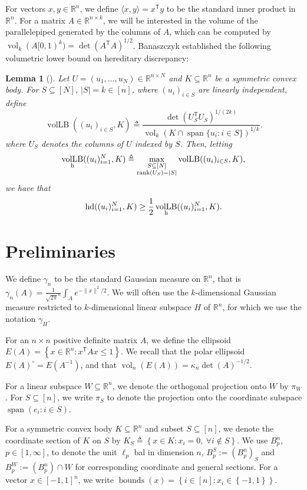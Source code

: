 \documentclass[12pt]{article}
\newtheorem{lemma}{Lemma}
\newcommand{\R}{{\mathbb{R}}}
\newcommand{\T}{\mathsf T}
\newcommand{\eqdef}{\triangleq}
\newcommand{\inner}[2]{\langle #1, #2 \rangle}
\newcommand{\set}[1]{\left\{ #1 \right\}}
\DeclareMathOperator{\vollb}{volLB}
\DeclareMathOperator{\hd}{hd}
\DeclareMathOperator{\vol}{vol}
\DeclareMathOperator{\lspan}{span}
\DeclareMathOperator{\bnds}{bounds}
\begin{document}
For vectors $x,y \in \R^n$, we define $\inner{x}{y} = x^\T y$ to be the standard
inner product in $\R^n$. For a matrix $A \in \R^{n \times k}$, we will be
interested in the volume of the parallelepiped generated by the columns of $A$,
which can be computed by $\vol_k(A[0,1)^k) = \det(A^\T A)^{1/2}$.  Banaszczyk
established the following volumetric lower bound on hereditary discrepancy:

\begin{lemma}[\cite{Bana93}]
\label{eq:vol-lb}
Let $U = (u_1,\dots,u_N) \in \R^{n \times N}$ and $K \subseteq \R^n$ be a
symmetric convex body. For $S \subseteq [N]$, $|S| = k \in [n]$, where $(u_i)_{i
\in S}$ are linearly independent, define  
\begin{equation}
\label{eq:vol-lb}
\vollb((u_i)_{i \in S}, K) 
                         \eqdef \frac{\det(U_S^\T U_S)^{1/(2k)}}{\vol_{k}(K \cap
\lspan\{u_i: i \in S\})^{1/k}}.
\end{equation}
where $U_S$ denotes the columns of $U$ indexed by $S$. Then, letting
\[
\vollb_{\rm h}((u_i)_{i=1}^N, K) \eqdef \max_{\substack{S \subseteq [N] \\ {\rm
rank}(U_S) = |S|}} \vollb((u_i)_{i \in S},K),
\]
we have that
\[
\hd((u_i)_{i=1}^N,K) \geq \frac{1}{2} \vollb_{\rm h}((u_i)_{i=1}^N,K) .
\]
\end{lemma}

\section{Preliminaries}

We define $\gamma_n$ to be the standard Gaussian measure on $\R^n$, that is
$\gamma_n(A) = \frac{1}{\sqrt{2\pi}^n} \int_A e^{-\|x\|^2/2}$. We will often use
the $k$-dimensional Gaussian measure restricted to $k$-dimensional linear
subspace $H$ of $\R^n$, for which we use the notation $\gamma_H$.

For an $n \times n$ positive definite matrix $A$, we define the ellipsoid $E(A)
= \set{x \in \R^n: x^\T A x \leq 1}$. We recall that the polar ellipsoid
$E(A)^\circ = E(A^{-1})$, and that $\vol_n(E(A)) = \kappa_n \det(A)^{-1/2}$.

For a linear subspace $W \subseteq \R^n$, we denote the orthogonal projection
onto $W$ by $\pi_W$. For $S \subseteq [n]$, we write $\pi_S$ to denote the
projection onto the coordinate subspace $\lspan(e_i: i \in S)$.

For a symmetric convex body $K \subseteq \R^n$ and subset $S \subseteq [n]$, we
denote the coordinate section of $K$ on $S$ by $K_S \eqdef \set{x \in K: x_i =
0, ~\forall i \notin S}$. We use $B_p^n$, $p \in [1,\infty]$, to denote the unit
$\ell_p$ bal in dimension $n$, $B_p^S := (B_p^n)_S$ and $B_p^W := (B_p^n) \cap W$
for corresponding coordinate and general sections. For a vector $x \in
[-1,1]^n$, we write $\bnds(x) = \set{i \in [n]: x_i \in \set{-1,1}}$.
\end{document}

